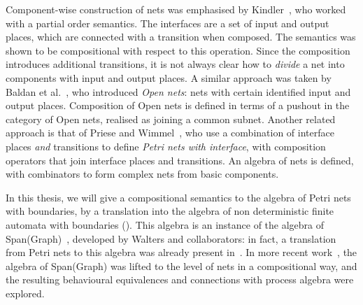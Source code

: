 Component-wise construction of nets was emphasised by
Kindler~\cite{Kindler1997}, who worked with a partial order semantics. The
interfaces are a set of input and output places, which are connected with a
transition when composed. The semantics was shown to be compositional with
respect to this operation. Since the composition introduces additional
transitions, it is not always clear how to \emph{divide} a net into components
with input and output places. A similar approach was taken by {Baldan et
al.}~\cite{Baldan2001}, who introduced \emph{Open nets}: nets with certain
identified input and output places. Composition of Open nets is defined in
terms of a pushout in the category of Open nets, realised as joining a common
subnet. Another related approach is that of {Priese and
Wimmel}~\cite{Priese1998}, who use a combination of interface places \emph{and}
transitions to define \emph{Petri nets with interface}, with composition
operators that join interface places and transitions. An algebra of nets is
defined, with combinators to form complex nets from basic components.

In this thesis, we will give a compositional semantics to the algebra of Petri
nets with boundaries, by a translation into the algebra of non deterministic
finite automata with boundaries (). This algebra is an instance of the algebra of
Span(Graph)~\cite{Katis1997}, developed by Walters and collaborators: in fact, a translation from
Petri nets to this algebra was already present in~\cite{Katis1997a}. In more recent
work~\cite{Sobocinski2010, Bruni2011, Bruni2013}, the algebra of Span(Graph) was lifted to the
level of nets in a compositional way, and the resulting behavioural equivalences and connections
with process algebra were explored.
